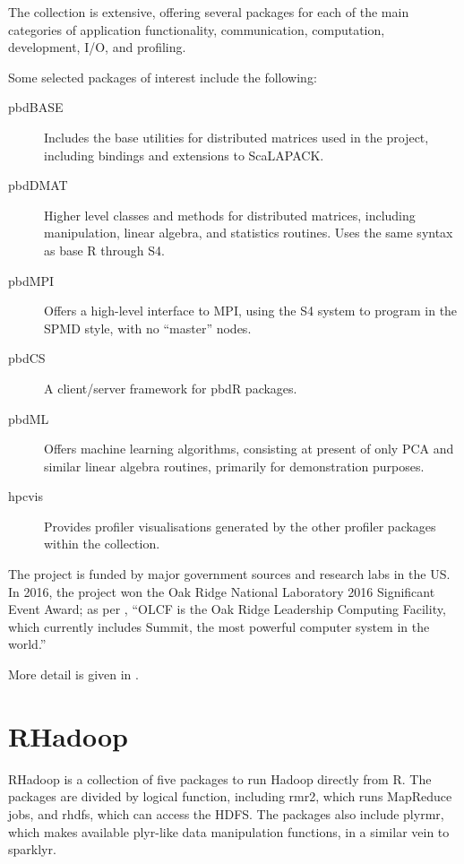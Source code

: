 \documentclass[10pt,a4paper]{article}
\begin{document}
The collection is extensive, offering several packages for each of the
main categories of application functionality, communication,
computation, development, I/O, and profiling.

Some selected packages of interest include the following:

\begin{description}
	\item[pbdBASE] Includes the base utilities for distributed matrices
	      used in the project, including bindings and extensions to ScaLAPACK\cite{pbdBASEpackage}.
	\item[pbdDMAT] Higher level classes and methods for distributed
	      matrices, including manipulation, linear algebra, and statistics
	      routines. Uses the same syntax as base R through S4\cite{pbdDMATpackage}.
	\item[pbdMPI] Offers a high-level interface to MPI, using the S4
	      system to program in the SPMD style, with no ``master'' nodes\cite{Chen2012pbdMPIpackage}.
	\item[pbdCS] A client/server framework for pbdR packages\cite{Schmidt2015pbdCSpackage}.
	\item[pbdML] Offers machine learning algorithms, consisting at present
	      of only PCA and similar linear algebra routines, primarily for
	      demonstration purposes\cite{schmidt20}.
	\item[hpcvis] Provides profiler visualisations generated by the other
	      profiler packages within the collection\cite{hpcvis}.
\end{description}

The project is funded by major government sources and research labs in
the US. In 2016, the project won the Oak Ridge National Laboratory
2016 Significant Event Award; as per \textcite{pbdR2012},
\enquote{OLCF is the Oak Ridge Leadership Computing Facility, which
	currently includes Summit, the most powerful computer system in the
	world.}

More detail is given in \textcite{pbdBASEvignette}.

\section{RHadoop}
\label{sec:rhadoop}

RHadoop is a collection of five packages to run Hadoop directly from
R\textcite{analytics:_rhadoop_wiki}. The packages are divided by
logical function, including rmr2, which runs MapReduce jobs, and
rhdfs, which can access the HDFS. The packages also include plyrmr,
which makes available plyr-like data manipulation functions, in a
similar vein to sparklyr.
\end{document}
